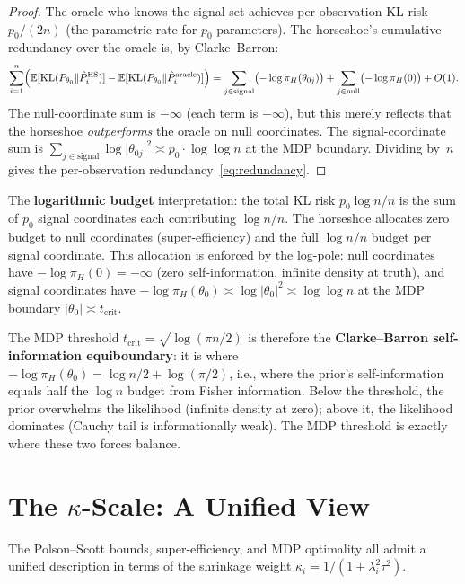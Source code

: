 \documentclass[12pt]{article}
\newcommand{\E}{\mathbb{E}}
\newcommand{\KL}{\mathrm{KL}}
\newcommand{\abs}[1]{\lvert #1 \rvert}
\newcommand{\piH}{\pi_H}
\newcommand{\tcrit}{t_{\mathrm{crit}}}
\begin{document}
\begin{proof}
The oracle who knows the signal set achieves per-observation KL risk $p_0/(2n)$ (the parametric rate for $p_0$ parameters). The horseshoe's cumulative redundancy over the oracle is, by Clarke--Barron:
\[
  \sum_{i=1}^n \Bigl(\E[\KL(P_{\theta_0} \| \hat{P}_i^{\mathrm{HS}})] - \E[\KL(P_{\theta_0} \| \hat{P}_i^{\mathrm{oracle}})]\Bigr)
  = \sum_{j \in \text{signal}} \bigl(-\log\piH(\theta_{0j})\bigr) + \sum_{j \in \text{null}} \bigl(-\log\piH(0)\bigr) + O(1).
\]
The null-coordinate sum is $-\infty$ (each term is $-\infty$), but this merely reflects that the horseshoe \emph{outperforms} the oracle on null coordinates. The signal-coordinate sum is $\sum_{j \in \text{signal}} \log\abs{\theta_{0j}}^2 \asymp p_0 \cdot \log\log n$ at the MDP boundary. Dividing by~$n$ gives the per-observation redundancy~\eqref{eq:redundancy}.
\end{proof}

The \textbf{logarithmic budget} interpretation: the total KL risk $p_0 \log n / n$ is the sum of $p_0$ signal coordinates each contributing $\log n / n$. The horseshoe allocates zero budget to null coordinates (super-efficiency) and the full $\log n / n$ budget per signal coordinate. This allocation is enforced by the log-pole: null coordinates have $-\log\piH(0) = -\infty$ (zero self-information, infinite density at truth), and signal coordinates have $-\log\piH(\theta_0) \asymp \log\abs{\theta_0}^2 \asymp \log\log n$ at the MDP boundary $\abs{\theta_0} \asymp \tcrit$.

The MDP threshold $\tcrit = \sqrt{\log(\pi n/2)}$ is therefore the \textbf{Clarke--Barron self-information equiboundary}: it is where $-\log\piH(\theta_0) = \log n/2 + \log(\pi/2)$, i.e., where the prior's self-information equals half the $\log n$ budget from Fisher information. Below the threshold, the prior overwhelms the likelihood (infinite density at zero); above it, the likelihood dominates (Cauchy tail is informationally weak). The MDP threshold is exactly where these two forces balance.


\section{The $\kappa$-Scale: A Unified View}\label{sec:kappa}

The Polson--Scott bounds, super-efficiency, and MDP optimality all admit a unified description in terms of the shrinkage weight $\kappa_i = 1/(1 + \lambda_i^2\tau^2)$.
\end{document}
